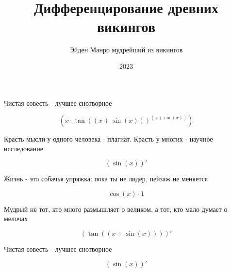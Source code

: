 \documentclass[a4paper,12pt]{article}
\title{\textbf{Дифференцирование древних викингов}}
\author{Эйден Манро мудрейший из викингов}
\date{2023}
\begin{document}
\maketitle
\begin{center}
Чистая совесть - лучшее снотворное
\end{center}

\begin{center}
\begin{equation}
(x \cdot \tan((x + \sin(x)))^{(x + \sin(x))})
\end{equation}
\end{center}

\begin{center}
Красть мысли у одного человека - плагиат. Красть у многих - научное исследование
\end{center}

\begin{center}
\begin{equation}
(\sin(x))'
\end{equation}
\end{center}

\begin{center}
Жизнь - это собачья упряжка: пока ты не лидер, пейзаж не меняется
\end{center}

\begin{center}
\begin{equation}
\cos(x) \cdot 1
\end{equation}
\end{center}

\begin{center}
Мудрый не тот, кто много размышляет о великом, а тот, кто мало думает о мелочах
\end{center}

\begin{center}
\begin{equation}
(\tan((x + \sin(x))))'
\end{equation}
\end{center}

\begin{center}
Чистая совесть - лучшее снотворное
\end{center}

\begin{center}
\begin{equation}
(\sin(x))'
\end{equation}
\end{center}
\end{document}

